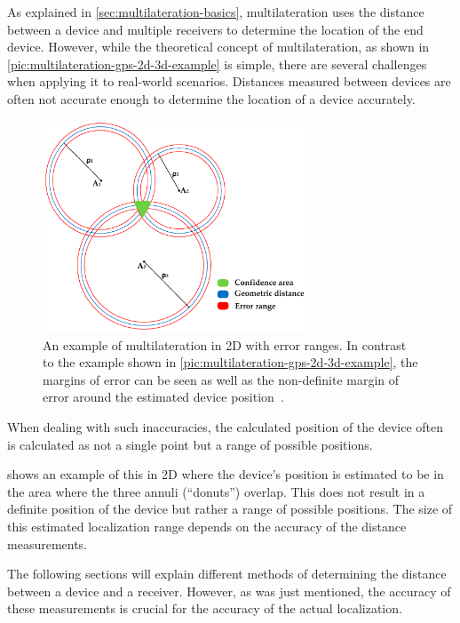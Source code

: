 As explained in \cref{sec:multilateration-basics}, multilateration uses the distance between a device and multiple receivers to determine the location of the end device.
However, while the theoretical concept of multilateration, as shown in \cref{pic:multilateration-gps-2d-3d-example} is simple, there are several challenges when applying it to real-world scenarios.
Distances measured between devices are often not accurate enough to determine the location of a device accurately.

\begin{figure}[htbp]
    \centering
    \includegraphics[width=0.7\textwidth]{pictures/multilateration/multilateration_error_ranges.png}
    \caption{
        An example of multilateration in 2D with error ranges.
        In contrast to the example shown in \cref{pic:multilateration-gps-2d-3d-example}, the margins of error can be seen as well as the non-definite margin of error around the estimated device position~\protect\cite{kapoor_novel_2016}.
    }\label{pic:multilateration-with-error-ranges-example}
\end{figure}

When dealing with such inaccuracies, the calculated position of the device often is calculated as not a single point but a range of possible positions.

 shows an example of this in 2D where the device's position is estimated to be in the area where the three annuli (``donuts'') overlap.
This does not result in a definite position of the device but rather a range of possible positions.
The size of this estimated localization range depends on the accuracy of the distance measurements.

The following sections will explain different methods of determining the distance between a device and a receiver.
However, as was just mentioned, the accuracy of these measurements is crucial for the accuracy of the actual localization.

